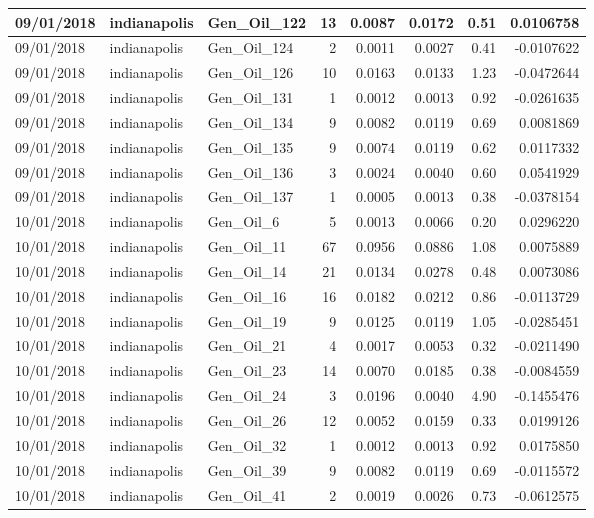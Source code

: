\documentclass[
  letterpaper,
  DIV=11,
  numbers=noendperiod]{scrartcl}
\begin{document}
\begin{tabular}{l|l|l|r|r|r|r|r}
\hline
09/01/2018 & indianapolis & Gen\_Oil\_122 & 13 & 0.0087 & 0.0172 & 0.51 & 0.0106758\\
\hline
09/01/2018 & indianapolis & Gen\_Oil\_124 & 2 & 0.0011 & 0.0027 & 0.41 & -0.0107622\\
\hline
09/01/2018 & indianapolis & Gen\_Oil\_126 & 10 & 0.0163 & 0.0133 & 1.23 & -0.0472644\\
\hline
09/01/2018 & indianapolis & Gen\_Oil\_131 & 1 & 0.0012 & 0.0013 & 0.92 & -0.0261635\\
\hline
09/01/2018 & indianapolis & Gen\_Oil\_134 & 9 & 0.0082 & 0.0119 & 0.69 & 0.0081869\\
\hline
09/01/2018 & indianapolis & Gen\_Oil\_135 & 9 & 0.0074 & 0.0119 & 0.62 & 0.0117332\\
\hline
09/01/2018 & indianapolis & Gen\_Oil\_136 & 3 & 0.0024 & 0.0040 & 0.60 & 0.0541929\\
\hline
09/01/2018 & indianapolis & Gen\_Oil\_137 & 1 & 0.0005 & 0.0013 & 0.38 & -0.0378154\\
\hline
10/01/2018 & indianapolis & Gen\_Oil\_6 & 5 & 0.0013 & 0.0066 & 0.20 & 0.0296220\\
\hline
10/01/2018 & indianapolis & Gen\_Oil\_11 & 67 & 0.0956 & 0.0886 & 1.08 & 0.0075889\\
\hline
10/01/2018 & indianapolis & Gen\_Oil\_14 & 21 & 0.0134 & 0.0278 & 0.48 & 0.0073086\\
\hline
10/01/2018 & indianapolis & Gen\_Oil\_16 & 16 & 0.0182 & 0.0212 & 0.86 & -0.0113729\\
\hline
10/01/2018 & indianapolis & Gen\_Oil\_19 & 9 & 0.0125 & 0.0119 & 1.05 & -0.0285451\\
\hline
10/01/2018 & indianapolis & Gen\_Oil\_21 & 4 & 0.0017 & 0.0053 & 0.32 & -0.0211490\\
\hline
10/01/2018 & indianapolis & Gen\_Oil\_23 & 14 & 0.0070 & 0.0185 & 0.38 & -0.0084559\\
\hline
10/01/2018 & indianapolis & Gen\_Oil\_24 & 3 & 0.0196 & 0.0040 & 4.90 & -0.1455476\\
\hline
10/01/2018 & indianapolis & Gen\_Oil\_26 & 12 & 0.0052 & 0.0159 & 0.33 & 0.0199126\\
\hline
10/01/2018 & indianapolis & Gen\_Oil\_32 & 1 & 0.0012 & 0.0013 & 0.92 & 0.0175850\\
\hline
10/01/2018 & indianapolis & Gen\_Oil\_39 & 9 & 0.0082 & 0.0119 & 0.69 & -0.0115572\\
\hline
10/01/2018 & indianapolis & Gen\_Oil\_41 & 2 & 0.0019 & 0.0026 & 0.73 & -0.0612575\\

\end{tabular}
\end{document}
